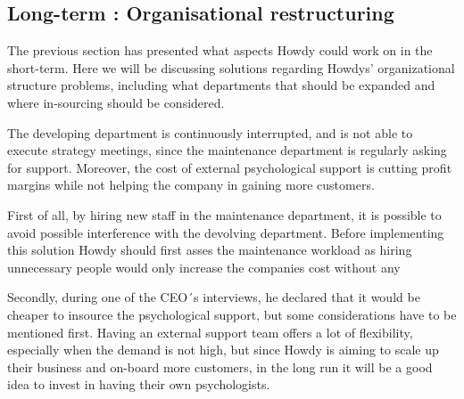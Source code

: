 \subsection{Long-term : Organisational restructuring}

The previous section has presented what aspects Howdy could work on in the short-term. Here we will be discussing solutions regarding Howdys' organizational structure problems, including what departments that should be expanded and where in-sourcing should be considered. 

\noindent The developing department is continuously interrupted, and is not able to execute strategy meetings, since the maintenance department is regularly asking for support. Moreover, the cost of external psychological support is cutting profit margins while not helping the company in gaining more customers.


\noindent First of all, by hiring new staff in the maintenance department, it is possible to avoid possible interference with the devolving department. Before implementing this solution Howdy should first asses the maintenance workload as hiring unnecessary people would only increase the companies cost without any 


\noindent Secondly, during one of the CEO´s interviews, he declared that it would be cheaper to insource the psychological support, but some considerations have to be mentioned first. Having an external support team offers a lot of flexibility, especially when the demand is not high, but since Howdy is aiming to scale up their business and on-board more customers, in the long run it will be a good idea to invest in having their own psychologists. 
 



